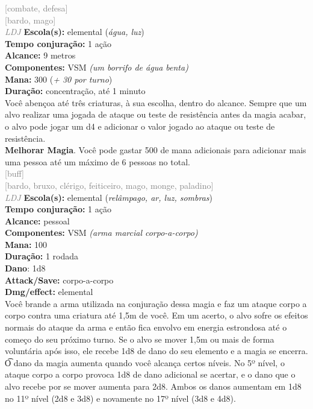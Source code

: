 \documentclass{RPG_Adventure}[2021/10/20]
\begin{document}
{\scriptsize \textcolor{gray}{[combate, defesa]\\}}
{\scriptsize \textcolor{gray}{[bardo, mago]\\}}
{\tiny \textcolor{gray}{\textit{LDJ}}}
{\small \t \textbf{Escola(s):} elemental (\textit{água, luz})\\\t \textbf{Tempo conjuração:} 1 ação\\\t \textbf{Alcance:} 9 metros\\\t \textbf{Componentes:} VSM \textit{(um borrifo de água benta)}\\\t \textbf{Mana:} 300 (\textit{+ 30 por turno})\\\t \textbf{Duração:} concentração, até 1 minuto\\}
{\normalsize Você abençoa até três criaturas, à sua escolha, dentro do alcance. Sempre que um alvo realizar uma jogada de ataque ou teste de resistência antes da magia acabar, o alvo pode jogar um d4 e adicionar o valor jogado ao ataque ou teste de resistência.\\\t \textbf{Melhorar Magia}. Você pode gastar 500 de mana adicionais para adicionar mais uma pessoa até um máximo de 6 pessoas no total.\\}
{\scriptsize \textcolor{gray}{[buff]\\}}
{\scriptsize \textcolor{gray}{[bardo, bruxo, clérigo, feiticeiro, mago, monge, paladino]\\}}
{\tiny \textcolor{gray}{\textit{LDJ}}}
{\small \t \textbf{Escola(s):} elemental (\textit{relâmpago, ar, luz, sombras})\\\t \textbf{Tempo conjuração:} 1 ação\\\t \textbf{Alcance:} pessoal\\\t \textbf{Componentes:} VSM \textit{(arma marcial corpo-a-corpo)}\\\t \textbf{Mana:} 100\\\t \textbf{Duração:} 1 rodada\\\t \textbf{Dano}: 1d8\\\t \textbf{Attack/Save:} corpo-a-corpo\\\t \textbf{Dmg/effect:} elemental\\}
{\normalsize Você brande a arma utilizada na conjuração dessa magia e faz um ataque corpo a corpo contra uma criatura até 1,5m de você. Em um acerto, o alvo sofre os efeitos normais do ataque da arma e então fica envolvo em energia estrondosa até o começo do seu próximo turno. Se o alvo se mover 1,5m ou mais de forma voluntária após isso, ele recebe 1d8 de dano do seu elemento e a magia se encerra.\\\t O dano da magia aumenta quando você alcança certos níveis. No 5º nível, o ataque corpo a corpo provoca 1d8 de dano adicional se acertar, e o dano que o alvo recebe por se mover aumenta para 2d8. Ambos os danos aumentam em 1d8 no 11º nível (2d8 e 3d8) e novamente no 17º nível (3d8 e 4d8).\\}
\end{document}
